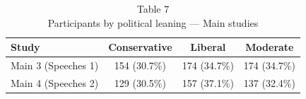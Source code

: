 \begin{table}[t]
\caption*{
{\large Table 7} \\ 
{\small Participants by political leaning — Main studies}
} 
\fontsize{12.0pt}{14.4pt}\selectfont
\begin{tabular*}{\linewidth}{@{\extracolsep{\fill}}lccc}
\toprule
Study & Conservative & Liberal & Moderate \\ 
\midrule\addlinespace[2.5pt]
Main 3 (Speeches 1) & 154 (30.7\%) & 174 (34.7\%) & 174 (34.7\%) \\ 
Main 4 (Speeches 2) & 129 (30.5\%) & 157 (37.1\%) & 137 (32.4\%) \\ 
\bottomrule
\end{tabular*}
\end{table}

